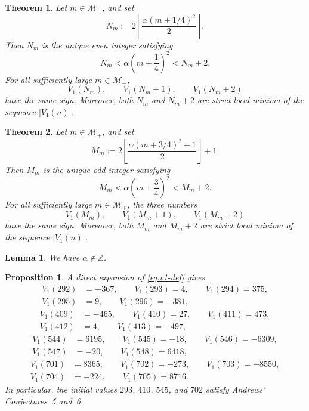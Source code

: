 \documentclass[10pt,a4paper]{amsart}
\newtheorem{theorem}{Theorem}
\newtheorem{lemma}{Lemma}
\newtheorem{proposition}{Proposition}
\newcommand{\Z}{\mathbb{Z}}
\begin{document}
\begin{theorem}\label{thm:minus-family}
Let $m\in \mathcal M_-$, and set
\[
  N_m:=2\left\lfloor \frac{\alpha(m+1/4)^2}{2}\right\rfloor.
\]
Then $N_m$ is the unique even integer satisfying
\begin{equation}\label{eq:Nm-def}
  N_m<\alpha\left(m+\frac14\right)^2<N_m+2.
\end{equation}
For all sufficiently large $m\in \mathcal M_-$,
\[
  V_1(N_m),\qquad V_1(N_m+1),\qquad V_1(N_m+2)
\]
have the same sign. Moreover, both $N_m$ and $N_m+2$ are strict local minima of the sequence $|V_1(n)|$.
\end{theorem}

\begin{theorem}\label{thm:plus-family}
Let $m\in \mathcal M_+$, and set
\[
  M_m:=2\left\lfloor \frac{\alpha(m+3/4)^2-1}{2}\right\rfloor+1.
\]
Then $M_m$ is the unique odd integer satisfying
\[
  M_m<\alpha\left(m+\frac34\right)^2<M_m+2.
\]
For all sufficiently large $m\in \mathcal M_+$, the three numbers
\[
  V_1(M_m),\qquad V_1(M_m+1),\qquad V_1(M_m+2)
\]
have the same sign. Moreover, both $M_m$ and $M_m+2$ are strict local minima of the sequence $|V_1(n)|$.
\end{theorem}

\begin{lemma}\label{lem:alpha-not-Z}
We have $\alpha\notin \Z$.
\end{lemma}

\begin{proposition}\label{prop:initial-values}
A direct expansion of \eqref{eq:v1-def} gives
\[
\begin{aligned}
V_1(292)&=-367,\qquad V_1(293)=4,\qquad V_1(294)=375,\\
V_1(295)&=9,\qquad V_1(296)=-381,
\end{aligned}
\]
\[
\begin{aligned}
V_1(409)&=-465,\qquad V_1(410)=27,\qquad V_1(411)=473,\\
V_1(412)&=4,\qquad V_1(413)=-497,
\end{aligned}
\]
\[
\begin{aligned}
V_1(544)&=6195,\qquad V_1(545)=-18,\qquad V_1(546)=-6309,\\
V_1(547)&=-20,\qquad V_1(548)=6418,
\end{aligned}
\]
\[
\begin{aligned}
V_1(701)&=8365,\qquad V_1(702)=-273,\qquad V_1(703)=-8550,\\
V_1(704)&=-224,\qquad V_1(705)=8716.
\end{aligned}
\]
In particular, the initial values $293$, $410$, $545$, and $702$ satisfy Andrews' Conjectures~5 and~6.
\end{proposition}
\end{document}
